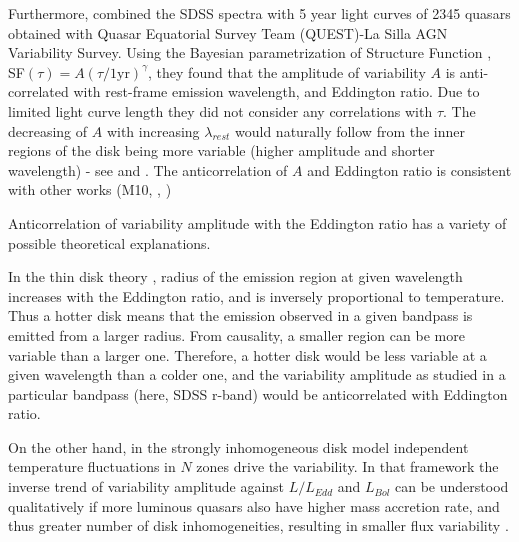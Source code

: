 \documentclass[twocolumn]{aastex62}
\begin{document}


Furthermore, \citet{sanchez2018} combined the SDSS spectra with 5 year light curves of 2345 quasars obtained with Quasar Equatorial Survey Team (QUEST)-La Silla AGN Variability Survey. Using the Bayesian parametrization of Structure Function \citep{schmidt2010},  SF$(\tau) = A(\tau/1 \mathrm{yr})^{\gamma} $, they found that the amplitude of variability $A$ is anti-correlated with rest-frame emission wavelength,  and Eddington ratio. Due to limited light curve length they did not consider any correlations with $\tau$. The decreasing of  $A$ with increasing  $\lambda_{rest}$ would naturally follow from the inner regions of the disk being more variable (higher amplitude and  shorter wavelength) - see \citep{fausnaugh2016} and \citep{edelson2015}. The anticorrelation of $A$ and Eddington ratio is consistent with other works (M10, \citealt{simm2016}, \citealt{rakshit2017})


Anticorrelation of  variability amplitude with the Eddington ratio  has a variety of possible theoretical explanations. 

In the thin disk theory \cite{shakura1973, frank2002, netzer2013}, radius of the emission region at given wavelength increases with the Eddington ratio, and is inversely proportional to temperature\cite{rakshit2017}. Thus a hotter disk means that the emission observed in a given bandpass is emitted from a larger radius. From causality, a smaller region can be more variable than a larger one. Therefore, a  hotter disk would be less variable at a given wavelength than a colder one, and  the variability amplitude as studied in a particular bandpass (here, SDSS r-band) would be anticorrelated with Eddington ratio. 

On the other hand, in the strongly inhomogeneous disk model \citet{dexter2011} independent temperature fluctuations in $N$ zones drive the variability. In that framework the inverse trend of variability amplitude against $L/L_{Edd}$  and $L_{Bol}$  can be understood qualitatively if more luminous quasars also have higher mass accretion rate, and thus greater number of disk inhomogeneities, resulting in smaller flux variability \citep{simm2016}. 

\end{document}

